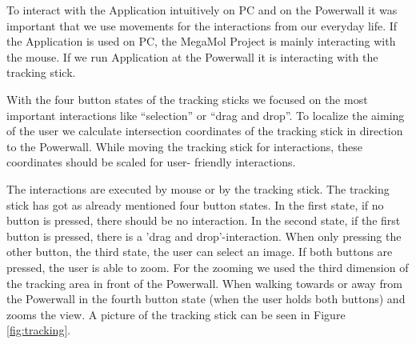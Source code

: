 \documentclass[journal]{vgtc}       %
\begin{document}
To interact with the Application intuitively on PC and on the Powerwall it was important that we use movements for the interactions from our everyday life. If the Application is used on PC, the MegaMol Project is mainly interacting with the mouse. If we run Application at the Powerwall it is interacting with the tracking stick.

With the four button states of the tracking sticks we focused on the most important interactions like ``selection'' or ``drag and drop''. To localize the aiming of the user  we  calculate  intersection coordinates of the tracking stick in direction to the Powerwall. While moving the tracking stick for interactions, these coordinates should be scaled for  user- friendly interactions.

The interactions are executed by mouse or by the tracking stick. The tracking stick has  got as already mentioned four button  states. In the first state, if no button is pressed, there should be no interaction. In the second state, if the first button is pressed, there is  a 'drag and drop'-interaction. When only  pressing the other button, the third state, the user can select an image. If both buttons are pressed, the user is able to zoom. For the zooming we used the third dimension of the tracking area in front of the Powerwall. When walking towards or away from the Powerwall in the fourth button state (when the user holds both buttons) and zooms the view. A picture of the tracking stick can be seen in Figure \ref{fig:tracking}.
\end{document}

